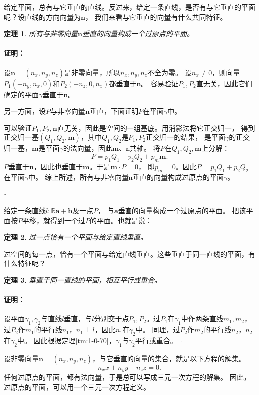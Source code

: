 \documentclass[12pt,UTF8]{ctexbook}
\newtheorem{tm}{定理}[section]
\renewenvironment{proof}{\paragraph{\textbf{证明：}}}{\hfill$\square$}
\begin{document}
给定平面，总有与它垂直的直线。反过来，给定一条直线，是否有与它垂直的平面呢？设直线的方向向量为$\mathbf{n}$，
我们来看与它垂直的向量有什么共同特征。
\begin{tm}\label{tm:1-3-60}
    所有与非零向量$\mathbf{n}$垂直的向量构成一个过原点的平面。    
\end{tm}
\begin{proof}
设$\mathbf{n} = (n_x, n_y, n_z)$是非零向量，所以$n_x, n_y, n_z$不全为零。
设$n_x\neq 0$，则向量$P_1(-n_y, n_x, 0)$和$P_2(-n_z, 0, n_x)$都垂直于$\mathbf{n}$。
容易验证$P_1,P_2$直无关，因此它们确定的平面$\gamma$垂直于$\mathbf{n}$。

另一方面，设$P$与非零向量$\mathbf{n}$垂直，下面证明$P$在平面$\gamma$中。

可以验证$P_1, P_2, \mathbf{n}$直无关，因此是空间的一组基底。用消影法将它正交归一，
得到正交归一基$(Q_1, Q_2,\mathbf{m})$，其中$Q_1,Q_2$是$P_1, P_2$正交归一的结果，
是平面$\gamma$的正交归一基，$\mathbf{m}$是平面$\gamma$的法向量，因此$\mathbf{m}$、$\mathbf{n}$共轴。
将$P$在$Q_1, Q_2,\mathbf{m}$上分解：
$$ P = p_1Q_1 + p_2Q_2 + p_m\mathbf{m}.$$
$P$垂直于$\mathbf{n}$，因此也垂直于$\mathbf{m}$。于是$\mathbf{m}\cdot P = 0$，
即$p_m = 0$。因此$P = p_1Q_1 + p_2Q_2$在平面$\gamma$中。
综上所述，所有与非零向量$\mathbf{n}$垂直的向量构成过原点的平面$\gamma$。

\end{proof}

给定一条直线$l:\mathbb{R}\mathbf{a} + \mathbf{b}$及一点$P$，
与$\mathbf{a}$垂直的向量构成一个过原点的平面。
把该平面按$P$平移，就得到一个过$P$的平面。也就是说：
\begin{tm}\label{tm:1-3-70}
    过一点恰有一个平面与给定直线垂直。
\end{tm}

过空间的每一点，恰有一个平面与给定直线垂直。这些垂直于同一直线的平面，有什么特征呢？
\begin{tm}\label{tm:1-3-80}
    垂直于同一直线的平面，相互平行或重合。
\end{tm}
\begin{proof}
    设平面$\gamma_1,\gamma_2$与直线$l$垂直，与$l$分别交于点$P_1,P_2$。过$P_1$在$\gamma_1$中作两条直线$m_1,m_2$，
    过$P_2$作$m_1$的平行线$n_1$，$n_1\perp l$，因此$n_1$在$\gamma_2$中。
    同理，过$P_2$作$m_2$的平行线$n_2$，$n_2$在$\gamma_2$中。
    因此根据定理\ref{tm:1-0-70}，$\gamma_1$与$\gamma_2$平行或重合。
\end{proof}

设非零向量$\mathbf{n} = (n_x, n_y, n_z)$，与它垂直的向量的集合，就是以下方程的解集。
$$ n_xx + n_yy + n_zz = 0. $$
任何过原点的平面，都有法向量，于是总可以写成三元一次方程的解集。
因此，过原点的平面，可以用一个三元一次方程定义。
\end{document}
